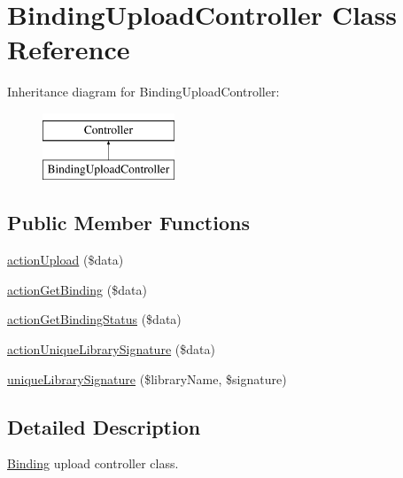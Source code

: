 \hypertarget{classBindingUploadController}{
\section{BindingUploadController Class Reference}
\label{classBindingUploadController}
}
Inheritance diagram for BindingUploadController:\begin{figure}[H]
\begin{center}
\leavevmode
\includegraphics[height=2.000000cm]{classBindingUploadController}
\end{center}
\end{figure}
\subsection*{Public Member Functions}
\begin{DoxyCompactItemize}
\item 
\hyperlink{classBindingUploadController_a00a73d1273ff14289fb98301da75530c}{actionUpload} (\$data)
\item 
\hyperlink{classBindingUploadController_a0afcb0a5af0efe0ad8ff69402e413e7f}{actionGetBinding} (\$data)
\item 
\hyperlink{classBindingUploadController_a2735f7ba9c4e31dd3a6c669b44f49b33}{actionGetBindingStatus} (\$data)
\item 
\hyperlink{classBindingUploadController_aa72c03504674104e40038b35f22681fa}{actionUniqueLibrarySignature} (\$data)
\item 
\hyperlink{classBindingUploadController_af7416b6c8e1a133094285d21e5d93f6d}{uniqueLibrarySignature} (\$libraryName, \$signature)
\end{DoxyCompactItemize}


\subsection{Detailed Description}
\hyperlink{classBinding}{Binding} upload controller class. 

